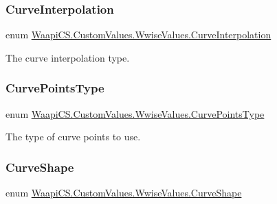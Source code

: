 \subsubsection{\texorpdfstring{Curve\+Interpolation}{CurveInterpolation}}
{\footnotesize\ttfamily enum \mbox{\hyperlink{class_waapi_c_s_1_1_custom_values_1_1_wwise_values_a9014a599ab2b6e81b5e841de3603244d}{Waapi\+C\+S.\+Custom\+Values.\+Wwise\+Values.\+Curve\+Interpolation}}\hspace{0.3cm}{\ttfamily [strong]}}



The curve interpolation type. 

\mbox{\label{class_waapi_c_s_1_1_custom_values_1_1_wwise_values_ae8b620ede7bbe13a8185450675c9ca75}} 
\subsubsection{\texorpdfstring{Curve\+Points\+Type}{CurvePointsType}}
{\footnotesize\ttfamily enum \mbox{\hyperlink{class_waapi_c_s_1_1_custom_values_1_1_wwise_values_ae8b620ede7bbe13a8185450675c9ca75}{Waapi\+C\+S.\+Custom\+Values.\+Wwise\+Values.\+Curve\+Points\+Type}}\hspace{0.3cm}{\ttfamily [strong]}}



The type of curve points to use. 

\mbox{\label{class_waapi_c_s_1_1_custom_values_1_1_wwise_values_a6a4ef16afabafaca1bd0c901c4103cf6}} 
\subsubsection{\texorpdfstring{Curve\+Shape}{CurveShape}}
{\footnotesize\ttfamily enum \mbox{\hyperlink{class_waapi_c_s_1_1_custom_values_1_1_wwise_values_a6a4ef16afabafaca1bd0c901c4103cf6}{Waapi\+C\+S.\+Custom\+Values.\+Wwise\+Values.\+Curve\+Shape}}\hspace{0.3cm}{\ttfamily [strong]}}



